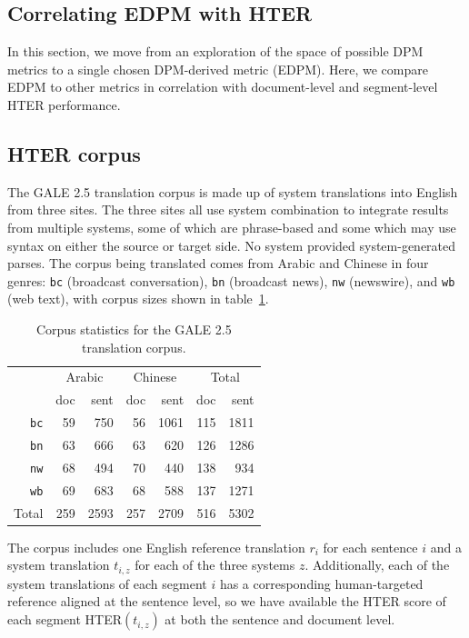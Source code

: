 \documentclass{kluwer}    %
\begin{document}
\begin{article}
\section{Correlating EDPM with HTER}
\label{sec:hter1}
In this section, we move from an exploration of the space of possible
DPM metrics to a single chosen DPM-derived metric (EDPM).  Here, we
compare EDPM to other metrics in correlation with document-level and
segment-level HTER performance.

\subsection{HTER corpus}

The GALE 2.5 translation corpus is made up of system translations into
English from three sites.
%
The three sites all use system combination to integrate results from
multiple systems, some of which are phrase-based and some which may
use syntax on either the source or target side. No system provided
system-generated parses.
%
The corpus being translated comes from Arabic and Chinese in four
genres: \texttt{bc} (broadcast conversation), \texttt{bn} (broadcast
news), \texttt{nw} (newswire), and \texttt{wb} (web text), with corpus
sizes shown in table~\ref{tab:galestats}.
\begin{table}
  \begin{tabular}{r|rr|rr|rr}
    \hline
     & \multicolumn{2}{c|}{Arabic} & \multicolumn{2}{c|}{Chinese}
     & \multicolumn{2}{c}{Total}\\
     & doc & sent & doc & sent & doc   & sent\\
     \hline
     \texttt{bc}    & 59  & 750 & 56 & 1061 & 115 & 1811\\
     \texttt{bn}    & 63  & 666 & 63 & 620  & 126 & 1286\\
     \texttt{nw}    & 68  & 494 & 70 & 440  & 138 & 934 \\
     \texttt{wb}    & 69  & 683 & 68 & 588  & 137 & 1271\\
     \hline
     Total & 259 & 2593& 257& 2709 & 516 & 5302\\
     \hline
  \end{tabular}
  \caption{Corpus statistics for the GALE 2.5 translation
    corpus.}
  \label{tab:galestats}
\end{table}
The corpus includes one English reference translation $r_i$
\cite{gale08phase2_5references} for each sentence $i$ and a system
translation $t_{i,z}$ for each of the three systems $z$. Additionally,
each of the system translations of each segment $i$ has a
corresponding human-targeted reference aligned at the sentence level,
so we have available the HTER score of each segment HTER$(t_{i,z})$ at
both the sentence and document level.


\end{article}
\end{document}
